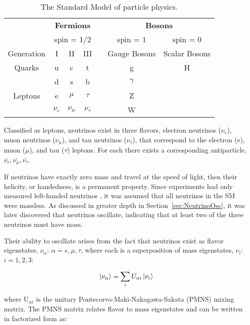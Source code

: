 \begin{table}
	\centering
\begin{tabular}{|c|c|c|c|c|c|c|}
	\hline 
	& \multicolumn{3}{c|}{\textbf{Fermions}} & & \multicolumn{2}{c|}{\textbf{Bosons}}  \\ 
	& \multicolumn{3}{c|}{spin = 1/2} & & spin = 1 & spin = 0 \\
	\hline 
	Generation & I & II & III & & Gauge Bosons & Scalar Bosons \\ 
	\hline 
	Quarks & u & c & t & & g & H \\ 
	& d & s & b & & $\gamma$ &  \\ 
	Leptons & e & $\mu$ & $\tau$ & &  Z &  \\ 
	& $\nu_{e}$ & $\nu_{\mu}$ & $\nu_{\tau}$ & & W &  \\ 
	\hline 
\end{tabular}
\caption{The Standard Model of particle physics.}
\label{tab:SM}
\end{table}

Classified as leptons, neutrinos exist in three flavors, electron neutrinos ($\nu_{e}$), muon neutrinos ($\nu_{\mu}$), and tau neutrinos ($\nu_{\tau}$), that correspond to the electron (e), muon ($\mu$), and tau ($\tau$) leptons.
For each there exists a corresponding antiparticle, $\bar{\nu_e}, \bar{\nu_\mu}, \bar{\nu_\tau}$.

If neutrinos have exactly zero mass and travel at the speed of light, then their helicity, or handedness, is a permanent property. 
Since experiments had only measured left-handed neutrinos \cite{PhysRev.109.1015}, it was assumed that all neutrinos in the SM were massless.
As discussed in greater depth in Section~\ref{sec:NeutrinoOsc}, it was later discovered that neutrinos oscillate, indicating that at least two of the three neutrinos must have mass.

Their ability to oscillate arises from the fact that neutrinos exist as flavor eigenstates, $\nu_\alpha$: $\alpha = e, \mu, \tau$, where each is a superposition of mass eigenstates, $\nu_i$: $i = 1, 2, 3$:

\begin{equation}
	\ket{\nu_\alpha} = \sum_{i}U_{\alpha i}\ket{\nu_i}
\end{equation}

where U$_{\alpha i}$ is the unitary Pontecorvo-Maki-Nakagawa-Sakata (PMNS) mixing matrix. 
The PMNS matrix relates flavor to mass eigenstates and can be written in factorized form as:

